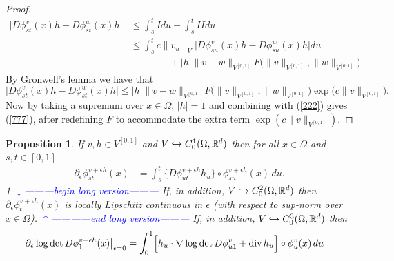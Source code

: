 \documentclass[noinfoline]{imsart}
\newtheorem{proposition}{Proposition}
\def\Ver{1}
\def\LongVer{1}
\begin{document}
\begin{proof}
\begin{align*} 
\bigl|D \phi_{st}^v(x)h -  D \phi_{st}^w(x)h\bigr | & \leq \int_s^t I du + \int_s^t I\!I du \\
&\leq  \int_s^t c\bigl\| v_u\bigl\|_{V} \bigl|   D \phi_{su}^v(x)h - D \phi_{su}^w(x)h  \bigr| du \\
&\qquad\qquad +  |h|  \|v-w\|_{V^{[0,1]}}  F\bigl(\|v \|_{V^{[0,1]}},\| w\|_{V^{[0,1]}}\bigr).
\end{align*}
By Gronwell's lemma we have that
\[\bigl|D \phi_{st}^v(x)h -  D \phi_{st}^w(x)h\bigr | \leq  |h|  \|v-w\|_{V^{[0,1]}}  F\bigl(\|v \|_{V^{[0,1]}},\| w\|_{V^{[0,1]}}\bigr) \exp\bigl ( c \bigl\| v\bigl\|_{V^{[0,1]}} \bigr) . \]
Now by taking a supremum over $x\in \Omega$, $|h|=1$ and combining with (\ref{222}) gives (\ref{777}), after redefining $F$ to accommodate the extra term $\exp ( c \bigl\| v\bigl\|_{V^{[0,1]}} )$.



 


\end{proof}

\begin{proposition} 
\label{proo}
If $v,h \in V^{[0,1]}$ and $V\hookrightarrow C_0^1(\Omega,\Bbb R^d)$ then for all $x\in \Omega$ and $s,t\in [0,1]$ 
\begin{align}
{\partial_\epsilon}  \phi^{ v+\epsilon h}_{st}(x)  &= \int_s^t  \bigl\{D\phi^{ v+\epsilon h}_{ut} h_u \bigr\}\circ{\phi^{ v+\epsilon h}_{su}(x)}\,   du. \label{111}
 \end{align}
\if\Ver\LongVer{ 
{\flushleft\textcolor{blue}{$\downarrow$---------begin long version---------}}\newline
If, in addition, $V\hookrightarrow C_0^2(\Omega,\Bbb R^d)$ then ${\partial_\epsilon}  \phi^{ v+\epsilon h}_t(x)  $ is locally Lipschitz continuous in $\epsilon$   (with respect to sup-norm over $x\in \Omega$). 
   {\flushleft\textcolor{blue}{$\uparrow$------------end long version---------}}\newline
} \fi
If, in addition,  $V\hookrightarrow C_0^3(\Omega,\Bbb R^d)$ then
\begin{align}
  \label{888}
\partial_\epsilon  \log \det D\phi_{1}^{v+\epsilon h }(x)\bigr|_{\epsilon = 0} & = \int_0^1  \Bigl[ h_u \cdot \nabla \log\det D\phi_{u1}^v  + \text{\rm div}\, h_u\Bigr] \circ  \phi^v_{u}(x)  \, du
\end{align}
\end{proposition}
\end{document}
